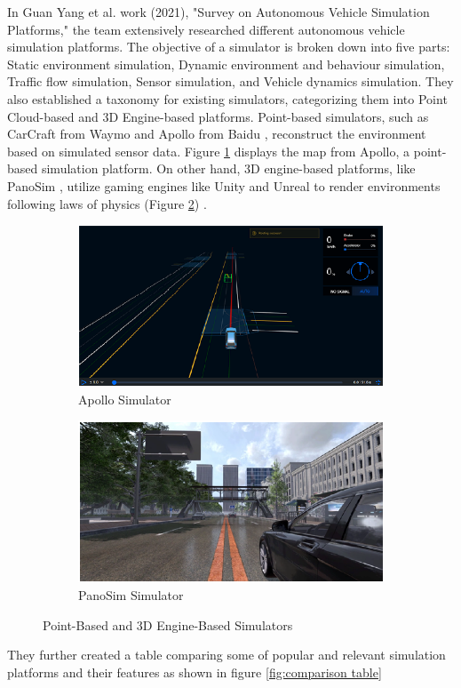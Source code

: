 \documentclass[12pt,twoside,a4paper,parskip]{scrbook} %
\begin{document}
In Guan Yang et al. work (2021), "Survey on Autonomous Vehicle Simulation Platforms," \cite{yangsurvey} the team extensively researched different autonomous vehicle simulation platforms. The objective of a simulator is broken down into five parts: Static environment simulation, Dynamic environment and behaviour simulation, Traffic flow simulation, Sensor simulation, and Vehicle dynamics simulation. They also established a taxonomy for existing simulators, categorizing them into Point Cloud-based and 3D Engine-based platforms. Point-based simulators, such as CarCraft from Waymo \cite{waymo} and Apollo from Baidu \cite{baidu}, reconstruct the environment based on simulated sensor data. Figure \ref{fig:apollo} displays the map from Apollo, a point-based simulation platform. On other hand, 3D engine-based platforms, like PanoSim \cite{panosim}, utilize gaming engines like Unity and Unreal to render environments following laws of physics (Figure \ref{fig:Panosim}) \cite{yangsurvey}.
\begin{figure}[H]
  \centering
  \begin{subfigure}{0.45\textwidth}
    \centering
    \includegraphics[width=\linewidth]{Images/Apollo_sim.png}
    \caption{Apollo Simulator}
    \label{fig:apollo}
  \end{subfigure}\hfill
  \begin{subfigure}{0.45\textwidth}
    \centering
    \includegraphics[width=\linewidth]{Images/Panosim.png} 
    \caption{PanoSim Simulator}
    \label{fig:Panosim}
  \end{subfigure}
  
  \caption{Point-Based and 3D Engine-Based Simulators}
  \label{fig:taxonomy_based_on_render}
\end{figure}
They further created a table comparing some of popular and relevant simulation platforms and their features as shown in figure \ref{fig:comparison table} \cite{yangsurvey}
\end{document}
